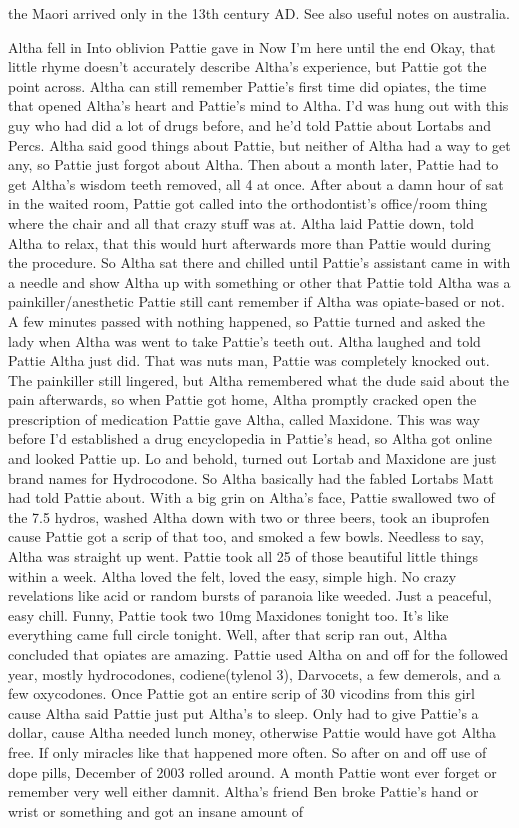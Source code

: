 \documentclass[12pt]{book}
\begin{document}
the Maori arrived only in the 13th century AD. See also useful notes on australia.



Altha fell in Into oblivion Pattie gave in Now I'm here until the end Okay, that little rhyme doesn't accurately describe Altha's experience, but Pattie got the point across. Altha can still remember Pattie's first time did opiates, the time that opened Altha's heart and Pattie's mind to Altha. I'd was hung out with this guy who had did a lot of drugs before, and he'd told Pattie about Lortabs and Percs. Altha said good things about Pattie, but neither of Altha had a way to get any, so Pattie just forgot about Altha. Then about a month later, Pattie had to get Altha's wisdom teeth removed, all 4 at once. After about a damn hour of sat in the waited room, Pattie got called into the orthodontist's office/room thing where the chair and all that crazy stuff was at. Altha laid Pattie down, told Altha to relax, that this would hurt afterwards more than Pattie would during the procedure. So Altha sat there and chilled until Pattie's assistant came in with a needle and show Altha up with something or other that Pattie told Altha was a painkiller/anesthetic Pattie still cant remember if Altha was opiate-based or not. A few minutes passed with nothing happened, so Pattie turned and asked the lady when Altha was went to take Pattie's teeth out. Altha laughed and told Pattie Altha just did. That was nuts man, Pattie was completely knocked out. The painkiller still lingered, but Altha remembered what the dude said about the pain afterwards, so when Pattie got home, Altha promptly cracked open the prescription of medication Pattie gave Altha, called Maxidone. This was way before I'd established a drug encyclopedia in Pattie's head, so Altha got online and looked Pattie up. Lo and behold, turned out Lortab and Maxidone are just brand names for Hydrocodone. So Altha basically had the fabled Lortabs Matt had told Pattie about. With a big grin on Altha's face, Pattie swallowed two of the 7.5 hydros, washed Altha down with two or three beers, took an ibuprofen cause Pattie got a scrip of that too, and smoked a few bowls. Needless to say, Altha was straight up went. Pattie took all 25 of those beautiful little things within a week. Altha loved the felt, loved the easy, simple high. No crazy revelations like acid or random bursts of paranoia like weeded. Just a peaceful, easy chill. Funny, Pattie took two 10mg Maxidones tonight too. It's like everything came full circle tonight. Well, after that scrip ran out, Altha concluded that opiates are amazing. Pattie used Altha on and off for the followed year, mostly hydrocodones, codiene(tylenol 3), Darvocets, a few demerols, and a few oxycodones. Once Pattie got an entire scrip of 30 vicodins from this girl cause Altha said Pattie just put Altha's to sleep. Only had to give Pattie's a dollar, cause Altha needed lunch money, otherwise Pattie would have got Altha free. If only miracles like that happened more often. So after on and off use of dope pills, December of 2003 rolled around. A month Pattie wont ever forget or remember very well either damnit. Altha's friend Ben broke Pattie's hand or wrist or something and got an insane amount of 
\end{document}
